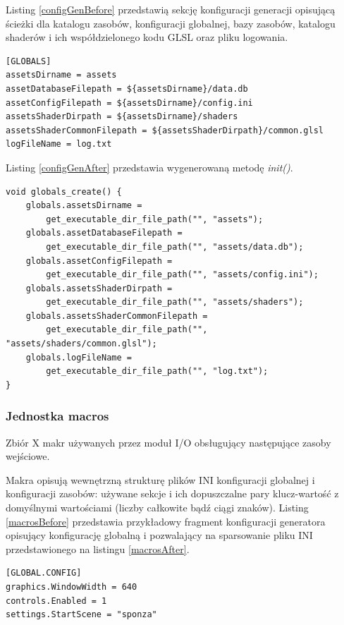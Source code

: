 Listing \ref{configGenBefore} przedstawią sekcję konfiguracji generacji opisującą ścieżki dla katalogu zasobów, konfiguracji globalnej, bazy zasobów, katalogu shaderów i ich współdzielonego kodu GLSL oraz pliku logowania.
\lstset{language=verbatim}
\begin{lstlisting}[caption={Konfiguracja generacji zmiennych},captionpos=b,label={configGenBefore}]
[GLOBALS]
assetsDirname = assets
assetDatabaseFilepath = ${assetsDirname}/data.db
assetConfigFilepath = ${assetsDirname}/config.ini
assetsShaderDirpath = ${assetsDirname}/shaders
assetsShaderCommonFilepath = ${assetsShaderDirpath}/common.glsl
logFileName = log.txt
\end{lstlisting}
Listing \ref{configGenAfter} przedstawia wygenerowaną metodę \textit{init()}.
\lstset{language=C}
\begin{lstlisting}[caption={Wynik generacji zmiennych},captionpos=b,label={configGenAfter}]
void globals_create() {
	globals.assetsDirname =
		get_executable_dir_file_path("", "assets");
	globals.assetDatabaseFilepath =
		get_executable_dir_file_path("", "assets/data.db");
	globals.assetConfigFilepath =
		get_executable_dir_file_path("", "assets/config.ini");
	globals.assetsShaderDirpath =
		get_executable_dir_file_path("", "assets/shaders");
	globals.assetsShaderCommonFilepath =
  		get_executable_dir_file_path("", "assets/shaders/common.glsl");
	globals.logFileName =
		get_executable_dir_file_path("", "log.txt");
}
\end{lstlisting}

\subsubsection{Jednostka macros}
Zbiór X makr używanych przez moduł I/O obsługujący następujące zasoby wejściowe.

Makra opisują wewnętrzną strukturę plików INI konfiguracji globalnej i konfiguracji zasobów: używane sekcje i ich dopuszczalne pary klucz-wartość z domyślnymi wartościami (liczby całkowite bądź ciągi znaków).
Listing \ref{macrosBefore} przedstawia przykładowy fragment konfiguracji generatora opisujący konfigurację globalną i pozwalający na sparsowanie pliku INI przedstawionego na listingu \ref{macrosAfter}.
\lstset{language=verbatim}
\begin{lstlisting}[caption={Konfiguracja generacji konfiguracji globalnej},captionpos=b,label={macrosBefore}]
[GLOBAL.CONFIG]
graphics.WindowWidth = 640
controls.Enabled = 1
settings.StartScene = "sponza"
\end{lstlisting}

